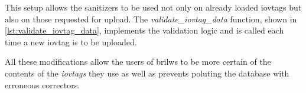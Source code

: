 This setup allows the sanitizers to be used not only on already loaded iovtags but also on those requested for upload. The \textit{validate\_iovtag\_data} function, shown in \autoref{lst:validate_iovtag_data}, implements the validation logic and is called each time a new iovtag is to be uploaded.

All these modifications allow the users of brilws to be more certain of the contents of the \textit{iovtags} they use as well as prevents poluting the database with erroneous correctors.







